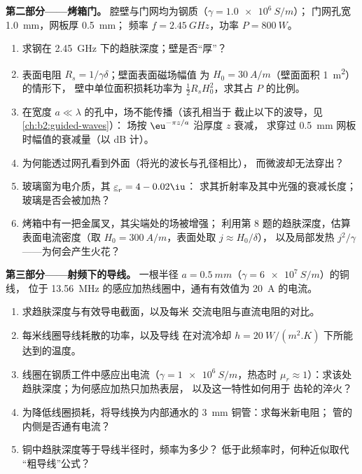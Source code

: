 \begin{problem}
\medskip
\noindent\textbf{第二部分——烤箱门。}
腔壁与门网均为钢质（$\gamma = \qty{1.0e6}{S/m}$）；
门网孔宽 \qty{1.0}{mm}，网板厚 \qty{0.5}{mm}；
频率 $f = \qty{2.45}{GHz}$，功率 $P = \qty{800}{W}$。
\begin{enumerate}[resume]
  \item 求钢在 \qty{2.45}{GHz} 下的趋肤深度；壁是否“厚”？
  \item 表面电阻 $R_s = 1/\gamma\delta$；壁面表面磁场幅值
        为 $H_0 = \qty{30}{A/m}$（壁面面积 \qty{1}{m^2}）的情形下，
        壁中单位面积损耗功率为 $\tfrac12R_sH_0^2$，求其占
        $P$ 的比例。
  \item 在宽度 $a \ll \lambda$ 的孔中，场不能传播（该孔相当于
        截止以下的波导，见\cref{ch:b2:guided-waves}）：
        场按 $\eu^{-\pi z/a}$ 沿厚度 $z$ 衰减，
        求穿过 \qty{0.5}{mm} 网板时幅值的衰减量（以 dB 计）。
  \item 为何能透过网孔看到外面（将光的波长与孔径相比），
        而微波却无法穿出？
  \item 玻璃窗为电介质，其 $\underline\varepsilon_r = 4 - 0.02\iu$：
        求其折射率及其中光强的衰减长度；
        玻璃是否会被加热？
  \item 烤箱中有一把金属叉，其尖端处的场被增强；
        利用第 8 题的趋肤深度，估算
        表面电流密度（取 $H_0 = \qty{300}{A/m}$，表面处取 $j \approx H_0/\delta$），
        以及局部发热 $j^2/\gamma$——为何会产生火花？
\end{enumerate}

\medskip
\noindent\textbf{第三部分——射频下的导线。}
一根半径 $a = \qty{0.5}{mm}$（$\gamma = \qty{6e7}{S/m}$）的铜线，
位于 \qty{13.56}{MHz} 的感应加热线圈中，通有有效值为 \qty{20}{A} 的电流。
\begin{enumerate}[resume]
  \item 求趋肤深度与有效导电截面，以及每米
        交流电阻与直流电阻的对比。
  \item 每米线圈导线耗散的功率，以及导线
        在对流冷却 $h = \qty{20}{W/(m^2.K)}$ 下所能达到的温度。
  \item 线圈在钢质工件中感应出电流（$\gamma =
        \qty{1e6}{S/m}$，热态时 $\mu_r \approx 1$）：求该处趋肤深度；为何感应加热只加热表层，
        以及这一特性如何用于
        齿轮的淬火？
  \item 为降低线圈损耗，将导线换为内部通水的 \qty{3}{mm}
        铜管：求每米新电阻；
        管的内侧是否通有电流？
  \item 铜中趋肤深度等于导线半径时，频率为多少？
        低于此频率时，何种近似取代
        “粗导线”公式？
\end{enumerate}


\end{problem}
